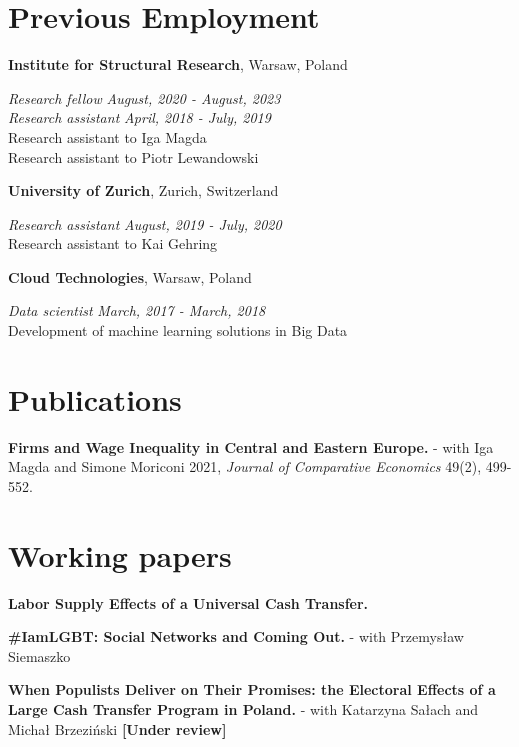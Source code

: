 \documentclass[margin,line]{res}
\begin{document}
\begin{resume}
\section{\sc Previous Employment}

{\bf Institute for Structural Research}, Warsaw, Poland

\vspace{-.3cm}
{\em Research fellow} \hfill \textit{August, 2020 - August, 2023}\\
{\em Research assistant} \hfill \textit{April, 2018 - July, 2019}\\
Research assistant to Iga Magda\\ 
Research assistant to Piotr Lewandowski 
\vspace*{.05in} 

{\bf University of Zurich}, Zurich, Switzerland

\vspace{-.3cm}
{\em Research assistant} \hfill \textit{August, 2019 - July, 2020}\\
Research assistant to Kai Gehring
\vspace*{.05in}  

{\bf Cloud Technologies}, Warsaw, Poland

\vspace{-.3cm}
{\em Data scientist} \hfill \textit{March, 2017 - March, 2018}\\
Development of machine learning solutions in Big Data
\vspace*{.05in}  

\section{\sc Publications}
\textbf{Firms and Wage Inequality in Central and Eastern Europe.} - with Iga Magda and Simone Moriconi 2021, \textit{Journal of Comparative Economics} 49(2), 499-552.
\vspace*{.05in}  

\section{\sc Working papers}

\textbf{Labor Supply Effects of a Universal Cash Transfer. }

\textbf{\#IamLGBT: Social Networks and Coming Out.} - with Przemysław Siemaszko 

\textbf{When Populists Deliver on Their Promises: the Electoral Effects of a Large Cash Transfer Program in Poland.} - with Katarzyna Sałach and Michał Brzeziński \textbf{[Under review]}


\end{resume}
\end{document}
